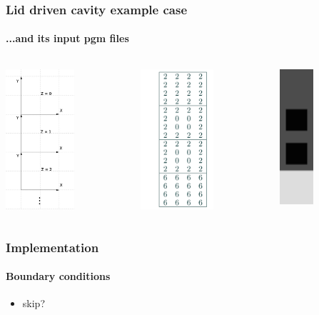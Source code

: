 \documentclass{beamer}
\begin{document}
\begin{frame}
\frametitle{Lid driven cavity example case}
\framesubtitle{...and its input pgm files}
\begin{columns}
\begin{column}{0.33\textwidth}
\includegraphics[height=5.2cm]{coord.jpg}
\end{column}
\begin{column}{0.33\textwidth}
\includegraphics[height=5.2cm]{cavity.png}
\end{column}
\begin{column}{0.33\textwidth}
\includegraphics[height=5cm]{cavity20202.jpg}
\end{column}
\end{columns}
\end{frame}

\begin{frame}
\frametitle{Implementation}
\framesubtitle{Boundary conditions}
\begin{itemize}
\item skip?
\end{itemize}
\end{frame}
\end{document}
